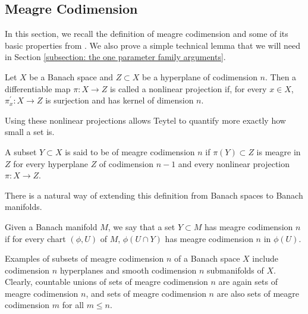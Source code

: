 \subsection{Meagre Codimension}
\label{subsection:meagre codimension}
In this section, we recall the definition of meagre codimension and some of its basic properties from \cite{Teytel1999}. We also prove a simple technical lemma that we will need in Section \ref{subsection: the one parameter family arguments}. 

\begin{definition}{\cite{Teytel1999}}
     Let $X$ be a Banach space and $Z\subset X$ be a hyperplane of codimension $n$. Then a differentiable map $\pi:X\to Z$ is called a nonlinear projection if, for every $x\in X$, $\pi^\prime_x:X\to Z$ is surjection and has kernel of dimension $n$.
\end{definition}
   
Using these nonlinear projections allows Teytel to quantify more exactly how small a set is. 

\begin{definition}{\cite{Teytel1999}}
        A subset $Y\subset X$ is said to be of meagre codimension $n$ if $\pi(Y)\subset Z$ is meagre in $Z$ for every hyperplane $Z$ of codimension $n-1$ and every nonlinear projection $\pi:X\to Z$.
\end{definition}

There is a natural way of extending this definition from Banach spaces to Banach manifolds.

\begin{definition}{\cite{Teytel1999}}
    Given a Banach manifold $M$, we say that a set $Y\subset M$ has meagre codimension $n$ if for every chart $(\phi,U)$ of $M$, $\phi(U\cap Y)$ has meagre codimension $n$ in $\phi(U)$. 
\end{definition}

Examples of subsets of meagre codimension $n$ of a Banach space $X$ include codimension $n$ hyperplanes and smooth codimension $n$ submanifolds of $X$. Clearly, countable unions of sets of meagre codimension $n$ are again sets of meagre codimension $n$, and sets of meagre codimension $n$ are also sets of meagre codimension $m$ for all $m\leq n$.\par


